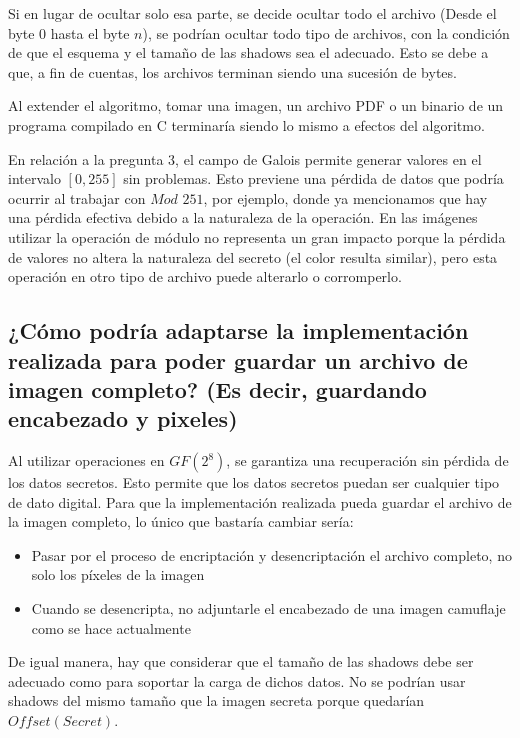 \documentclass[11pt]{scrartcl} %
\begin{document}
Si en lugar de ocultar solo esa parte, se decide ocultar todo el archivo (Desde el byte $0$ hasta el byte $n$), se podrían ocultar todo tipo de archivos, con la condición de que el esquema y el tamaño de las shadows sea el adecuado. Esto se debe a que, a fin de cuentas, los archivos terminan siendo una sucesión de bytes.

Al extender el algoritmo, tomar una imagen, un archivo PDF o un binario de un programa compilado en C terminaría siendo lo mismo a efectos del algoritmo.

En relación a la pregunta 3, el campo de Galois permite generar valores en el intervalo $[0, 255]$ sin problemas. Esto previene una pérdida de datos que podría ocurrir al trabajar con $Mod$ $251$, por ejemplo, donde ya mencionamos que hay una pérdida efectiva debido a la naturaleza de la operación. En las imágenes utilizar la operación de módulo no representa un gran impacto porque la pérdida de valores no altera la naturaleza del secreto (el color resulta similar), pero esta operación en otro tipo de archivo puede alterarlo o corromperlo.


\subsection{¿Cómo podría adaptarse la implementación realizada para poder guardar un archivo de imagen completo? (Es decir, guardando encabezado y pixeles)}

Al utilizar operaciones en $GF(2^8)$, se garantiza una recuperación sin pérdida de los datos secretos. Esto permite que los datos secretos puedan ser cualquier tipo de dato digital. Para que la implementación realizada pueda guardar el archivo de la imagen completo, lo único que bastaría cambiar sería:

\begin{itemize}
  \item Pasar por el proceso de encriptación y desencriptación el archivo completo, no solo los píxeles de la imagen
  \item Cuando se desencripta, no adjuntarle el encabezado de una imagen camuflaje como se hace actualmente
\end{itemize}

De igual manera, hay que considerar que el tamaño de las shadows debe ser adecuado como para soportar la carga de dichos datos. No se podrían usar shadows del mismo tamaño que la imagen secreta porque quedarían $Offset(Secret)$.
\end{document}

